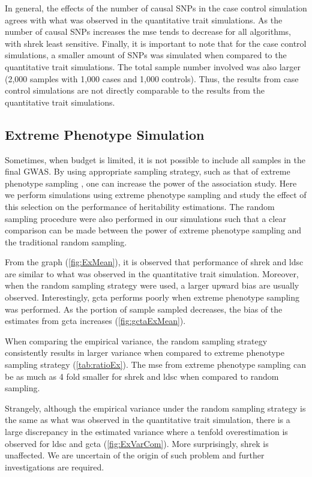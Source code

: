 \documentclass[12pt]{scrbook}
\begin{document}
In general, the effects of the number of causal \glspl{SNP} in the case control simulation agrees with what was observed in the quantitative trait simulations.
As the number of causal \glspl{SNP} increases the \gls{mse} tends to decrease for all algorithms, with \gls{shrek} least sensitive.
Finally, it is important to note that for the case control simulations, a smaller amount of \glspl{SNP} was simulated when compared to the quantitative trait simulations. 
The total sample number involved was also larger (2,000 samples with 1,000 cases and 1,000 controls).
Thus, the results from case control simulations are not directly comparable to the results from the quantitative trait simulations.

\subsection{Extreme Phenotype Simulation}

Sometimes, when budget is limited, it is not possible to include all samples in the final \gls{GWAS}. 
By using appropriate sampling strategy, such as that of extreme phenotype sampling \citep{Peloso2015}, one can increase the power of the association study.
Here we perform simulations using extreme phenotype sampling and study the effect of this selection on the performance of heritability estimations.
The random sampling procedure were also performed in our simulations such that a clear comparison can be made between the power of extreme phenotype sampling and the traditional random sampling.

From the graph (\cref{fig:ExMean}), it is observed that performance of \gls{shrek} and \gls{ldsc} are similar to what was observed in the quantitative trait simulation.
Moreover, when the random sampling strategy were used, a larger upward bias are usually observed. 
Interestingly, \gls{gcta} performs poorly when extreme phenotype sampling was performed.
As the portion of sample sampled decreases, the bias of the estimates from \gls{gcta} increases (\cref{fig:gctaExMean}).

When comparing the empirical variance, the random sampling strategy consistently results in larger variance when compared to extreme phenotype sampling strategy (\cref{tab:ratioEx}).
The \gls{mse} from extreme phenotype sampling can be as much as 4 fold smaller for \gls{shrek} and \gls{ldsc} when compared to random sampling.

Strangely, although the empirical variance under the random sampling strategy is the same as what was observed in the quantitative trait simulation, there is a large discrepancy in the estimated variance where a tenfold overestimation is observed for \gls{ldsc} and \gls{gcta} (\cref{fig:ExVarCom}). 
More surprisingly, \gls{shrek} is unaffected. 
We are uncertain of the origin of such problem and further investigations are required.
\end{document}
